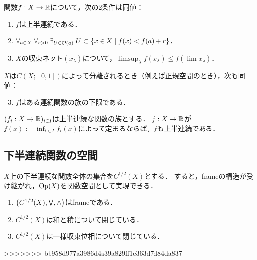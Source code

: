\documentclass[uplatex,dvipdfmx]{jsreport}
\begin{document}
\begin{proposition}[上半連続性の特徴付け]
    関数$f:X\to\mathbb{R}$について，次の2条件は同値：
    \begin{enumerate}
        \item $f$は上半連続である．
        \item $\forall_{a\in X}\;\forall_{r>0}\;\exists_{U\in\mathcal{O}(a)}\;U\subset\left\{x\in X\mid f(x)<f(a)+r\right\}$．
        \item $X$の収束ネット$(x_\lambda)$について，$\limsup_\lambda f(x_\lambda)\le f(\lim x_\lambda)$．
    \end{enumerate}
    $X$は$C(X;[0,1])$によって分離されるとき（例えば正規空間のとき），次も同値：
    \begin{enumerate}\setcounter{enumi}{2}
        \item $f$はある連続関数の族の下限である．
    \end{enumerate}
\end{proposition}

\begin{proposition}[上半連続性の保存]
    $(f_i:X\to\mathbb{R})_{i\in I}$は上半連続な関数の族とする．
    $f:X\to\mathbb{R}$が$f(x):=\inf_{i\in I}f_i(x)$によって定まるならば，$f$も上半連続である．
\end{proposition}

\subsection{下半連続関数の空間}

\begin{tcolorbox}[colframe=ForestGreen, colback=ForestGreen!10!white,breakable,colbacktitle=ForestGreen!40!white,coltitle=black,fonttitle=\bfseries\sffamily,
    title=]
    $X$上の下半連続な関数全体の集合を$C^{1/2}(X)$とする．
    すると，frameの構造が受け継がれ，$\mathrm{Op}(X)$を関数空間として実現できる．
\end{tcolorbox}

\begin{proposition}\mbox{}
    \begin{enumerate}
        \item $\left(C^{1/2}(X),\bigvee,\land\right)$はframeである．
        \item $C^{1/2}(X)$は和と積について閉じている．
        \item $C^{1/2}(X)$は一様収束位相について閉じている．
    \end{enumerate}
\end{proposition}
>>>>>>> bb958d977a3986d4a39a829ff1e363d7d84da837
\end{document}
